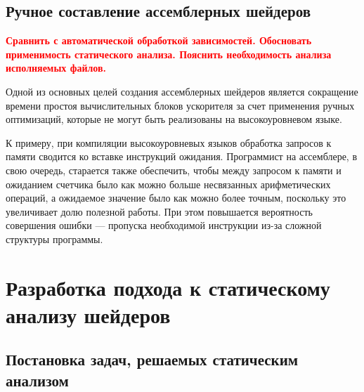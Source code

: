 \documentclass[a4paper,14pt]{extarticle}
\newcommand{\todo}[1]{\textbf{\textcolor{red}{#1}}}
\begin{document}
{\subsection{Ручное составление ассемблерных шейдеров}

\todo{Сравнить с автоматической обработкой зависимостей. Обосновать применимость
статического анализа. Пояснить необходимость анализа исполняемых файлов.}

Одной из основных целей создания ассемблерных шейдеров является сокращение
времени простоя вычислительных блоков ускорителя за счет применения ручных оптимизаций,
которые не могут быть реализованы на высокоуровневом языке.

К примеру, при компиляции высокоуровневых языков обработка запросов к памяти сводится ко вставке
инструкций ожидания. Программист на ассемблере, в свою очередь, старается также обеспечить,
чтобы между запросом к памяти и ожиданием счетчика было как можно больше несвязанных
арифметических операций, а ожидаемое значение было как можно более точным, поскольку
это увеличивает долю полезной работы. При этом повышается вероятность совершения
ошибки — пропуска необходимой инструкции из-за сложной структуры программы.

%
%

\section{Разработка подхода к статическому анализу шейдеров}
\label{section:algorithms}

\subsection{Постановка задач, решаемых статическим анализом}

}
\end{document}
